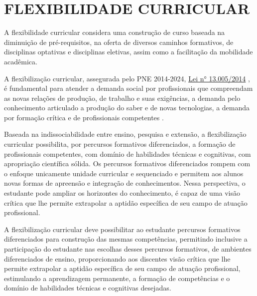 \section{FLEXIBILIDADE CURRICULAR}
\label{sec:flex}

A flexibilidade curricular considera uma construção de curso baseada na diminuição de pré-requisitos, na oferta de diversos caminhos formativos, de disciplinas optativas e disciplinas eletivas, assim como a facilitação da mobilidade acadêmica.

A flexibilização curricular, assegurada pelo PNE 2014-2024, \href{http://www.planalto.gov.br/ccivil_03/_ato2011-2014/2014/lei/l13005.htm}{Lei n° 13.005/2014} \cite{Lei:13005:2014}, é fundamental para atender a demanda social por profissionais que compreendam as novas relações de produção, de trabalho e suas exigências, a demanda pelo conhecimento articulado a produção do saber e de novas tecnologias, a demanda por formação crítica e de profissionais competentes \cite{pdiutfpr}.

Baseada na indissociabilidade entre ensino, pesquisa e extensão, a flexibilização curricular possibilita, por percursos formativos diferenciados, a formação de profissionais competentes, com domínio de habilidades técnicas e cognitivas, com apropriação científica sólida. Os percursos formativos diferenciados rompem com o enfoque unicamente unidade curricular e sequenciado e permitem aos alunos novas formas de apreensão e integração de conhecimentos. Nessa perspectiva, o estudante pode ampliar os horizontes do conhecimento, é capaz de uma visão crítica que lhe permite extrapolar a aptidão específica de seu campo de atuação profissional.

A flexibilização curricular deve possibilitar ao estudante percursos formativos diferenciados para construção das mesmas competências, permitindo inclusive a participação do estudante nas escolhas desses percursos formativos, de ambientes diferenciados de ensino, proporcionando aos discentes visão crítica que lhe permite extrapolar a aptidão específica de seu campo de atuação profissional, estimulando a aprendizagem permanente, a formação de competências e o domínio de habilidades técnicas e cognitivas desejadas.


